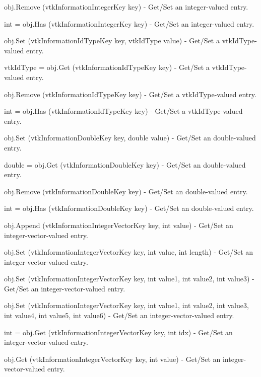 \begin{DoxyItemize}
\item {\ttfamily obj.\-Remove (vtk\-Information\-Integer\-Key key)} -\/ Get/\-Set an integer-\/valued entry.  
\item {\ttfamily int = obj.\-Has (vtk\-Information\-Integer\-Key key)} -\/ Get/\-Set an integer-\/valued entry.  
\item {\ttfamily obj.\-Set (vtk\-Information\-Id\-Type\-Key key, vtk\-Id\-Type value)} -\/ Get/\-Set a vtk\-Id\-Type-\/valued entry.  
\item {\ttfamily vtk\-Id\-Type = obj.\-Get (vtk\-Information\-Id\-Type\-Key key)} -\/ Get/\-Set a vtk\-Id\-Type-\/valued entry.  
\item {\ttfamily obj.\-Remove (vtk\-Information\-Id\-Type\-Key key)} -\/ Get/\-Set a vtk\-Id\-Type-\/valued entry.  
\item {\ttfamily int = obj.\-Has (vtk\-Information\-Id\-Type\-Key key)} -\/ Get/\-Set a vtk\-Id\-Type-\/valued entry.  
\item {\ttfamily obj.\-Set (vtk\-Information\-Double\-Key key, double value)} -\/ Get/\-Set an double-\/valued entry.  
\item {\ttfamily double = obj.\-Get (vtk\-Information\-Double\-Key key)} -\/ Get/\-Set an double-\/valued entry.  
\item {\ttfamily obj.\-Remove (vtk\-Information\-Double\-Key key)} -\/ Get/\-Set an double-\/valued entry.  
\item {\ttfamily int = obj.\-Has (vtk\-Information\-Double\-Key key)} -\/ Get/\-Set an double-\/valued entry.  
\item {\ttfamily obj.\-Append (vtk\-Information\-Integer\-Vector\-Key key, int value)} -\/ Get/\-Set an integer-\/vector-\/valued entry.  
\item {\ttfamily obj.\-Set (vtk\-Information\-Integer\-Vector\-Key key, int value, int length)} -\/ Get/\-Set an integer-\/vector-\/valued entry.  
\item {\ttfamily obj.\-Set (vtk\-Information\-Integer\-Vector\-Key key, int value1, int value2, int value3)} -\/ Get/\-Set an integer-\/vector-\/valued entry.  
\item {\ttfamily obj.\-Set (vtk\-Information\-Integer\-Vector\-Key key, int value1, int value2, int value3, int value4, int value5, int value6)} -\/ Get/\-Set an integer-\/vector-\/valued entry.  
\item {\ttfamily int = obj.\-Get (vtk\-Information\-Integer\-Vector\-Key key, int idx)} -\/ Get/\-Set an integer-\/vector-\/valued entry.  
\item {\ttfamily obj.\-Get (vtk\-Information\-Integer\-Vector\-Key key, int value)} -\/ Get/\-Set an integer-\/vector-\/valued entry.  

\end{DoxyItemize}
